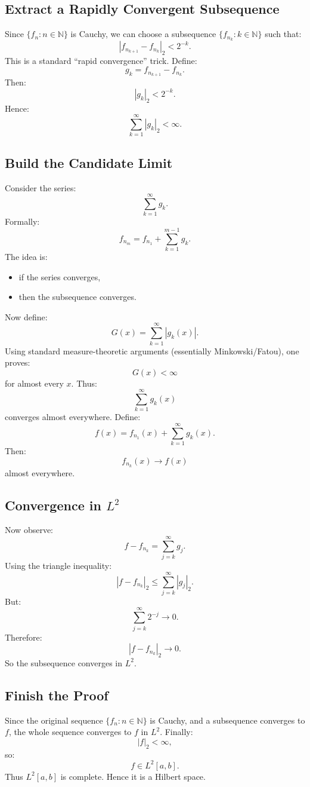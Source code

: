 \documentclass[aps,prl,twocolumn,groupedaddress]{revtex4-2}
\newcommand{\NN}{\mathbb{N}}
\begin{document}
\subsection{Extract a Rapidly Convergent Subsequence}

Since $\{f_n:n\in \NN\}$ is Cauchy, we can choose a subsequence
$\{f_{n_k}:k\in \NN\}$
such that:
$$
|f_{n_{k+1}}-f_{n_k}|_2
<
2^{-k}.
$$
This is a standard ``rapid convergence'' trick.
Define:
$$
g_k
=
f_{n_{k+1}}-f_{n_k}.
$$
Then:
$$
|g_k|_2<2^{-k}.
$$
Hence:
$$
\sum_{k=1}^\infty |g_k|_2
<
\infty.
$$

\subsection{Build the Candidate Limit}

Consider the series:
$$
\sum_{k=1}^\infty g_k.
$$
Formally:
$$
f_{n_m}
=
f_{n_1}
+
\sum_{k=1}^{m-1} g_k.
$$
The idea is:
\begin{itemize}
\item if the series converges,
\item then the subsequence converges.
\end{itemize}
Now define:
$$
G(x)
=
\sum_{k=1}^\infty |g_k(x)|.
$$
Using standard measure-theoretic arguments (essentially Minkowski/Fatou), one proves:
$$
G(x)<\infty
$$
for almost every $x$.
Thus:
$$
\sum_{k=1}^{\infty} g_k(x)
$$
converges almost everywhere.
Define:
$$
f(x)
=
f_{n_1}(x)
+
\sum_{k=1}^\infty g_k(x).
$$
Then:
$$
f_{n_k}(x)\to f(x)
$$
almost everywhere.

\subsection{Convergence in $L^2$}
Now observe:
$$
f-f_{n_k}
=
\sum_{j=k}^\infty g_j.
$$
Using the triangle inequality:
$$
|f-f_{n_k}|_2
\le
\sum_{j=k}^\infty |g_j|_2.
$$
But:
$$
\sum_{j=k}^\infty 2^{-j}\to 0.
$$
Therefore:
$$
|f-f_{n_k}|_2\to 0.
$$
So the subsequence converges in $L^2$.

\subsection{Finish the Proof}

Since the original sequence $\{f_n:n\in \NN\}$ is Cauchy, and a subsequence converges to $f$, the whole sequence converges to $f$ in $L^2$.
Finally:
$$
|f|_2<\infty,
$$
so:
$$
f\in L^2[a,b].
$$
Thus $L^2[a,b]$ is complete.
Hence it is a Hilbert space.
\end{document}
